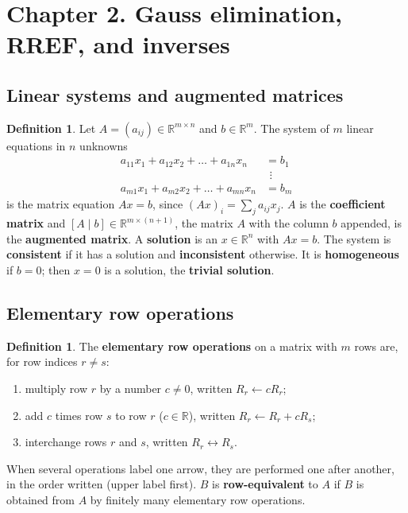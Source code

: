 \documentclass[12pt]{article}
\def\unitnumber{1}
\newcommand{\R}{\mathbb R}
\theoremstyle{definition}
\newtheorem{definition}[theorem]{Definition}
\begin{document}
\clearpage
\def\unitnumber{2}
\setcounter{theorem}{0}\setcounter{problem}{0}
\section*{Chapter 2. Gauss elimination, RREF, and inverses}

\subsection*{Linear systems and augmented matrices}

\begin{definition}\label{r2-def-system}
Let \(A=(a_{ij})\in\R^{m\times n}\) and \(b\in\R^m\). The system of \(m\) linear equations
in \(n\) unknowns
\[
\begin{aligned}
a_{11}x_1+a_{12}x_2+\dots+a_{1n}x_n&=b_1\\
&\ \,\vdots\\
a_{m1}x_1+a_{m2}x_2+\dots+a_{mn}x_n&=b_m
\end{aligned}
\]
is the matrix equation \(Ax=b\), since \((Ax)_i=\sum_ja_{ij}x_j\). \(A\) is the
\textbf{coefficient matrix} and \([A\mid b]\in\R^{m\times(n+1)}\), the matrix \(A\) with
the column \(b\) appended, is the \textbf{augmented matrix}. A \textbf{solution} is an
\(x\in\R^n\) with \(Ax=b\). The system is \textbf{consistent} if it has a solution and
\textbf{inconsistent} otherwise. It is \textbf{homogeneous} if \(b=0\); then \(x=0\) is a
solution, the \textbf{trivial solution}.
\end{definition}

\subsection*{Elementary row operations}

\begin{definition}\label{r2-def-rowops}
The \textbf{elementary row operations} on a matrix with \(m\) rows are, for row indices
\(r\ne s\):
\begin{enumerate}[label=(\arabic*)]
\item multiply row \(r\) by a number \(c\ne0\), written \(R_r\leftarrow cR_r\);
\item add \(c\) times row \(s\) to row \(r\) (\(c\in\R\)), written \(R_r\leftarrow R_r+cR_s\);
\item interchange rows \(r\) and \(s\), written \(R_r\leftrightarrow R_s\).
\end{enumerate}
When several operations label one arrow, they are performed one after another, in the order
written (upper label first). \(B\) is \textbf{row-equivalent} to \(A\) if \(B\) is obtained
from \(A\) by finitely many elementary row operations.
\end{definition}
\end{document}
